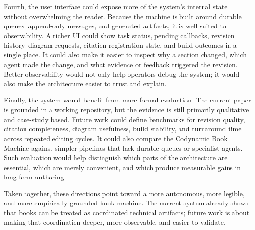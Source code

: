 Fourth, the user interface could expose more of the system's internal state without overwhelming the reader. Because the machine is built around durable queues, append-only messages, and generated artifacts, it is well suited to observability. A richer UI could show task status, pending callbacks, revision history, diagram requests, citation registration state, and build outcomes in a single place. It could also make it easier to inspect why a section changed, which agent made the change, and what evidence or feedback triggered the revision. Better observability would not only help operators debug the system; it would also make the architecture easier to trust and explain.

Finally, the system would benefit from more formal evaluation. The current paper is grounded in a working repository, but the evidence is still primarily qualitative and case-study based. Future work could define benchmarks for revision quality, citation completeness, diagram usefulness, build stability, and turnaround time across repeated editing cycles. It could also compare the Codynamic Book Machine against simpler pipelines that lack durable queues or specialist agents. Such evaluation would help distinguish which parts of the architecture are essential, which are merely convenient, and which produce measurable gains in long-form authoring.

Taken together, these directions point toward a more autonomous, more legible, and more empirically grounded book machine. The current system already shows that books can be treated as coordinated technical artifacts; future work is about making that coordination deeper, more observable, and easier to validate.
